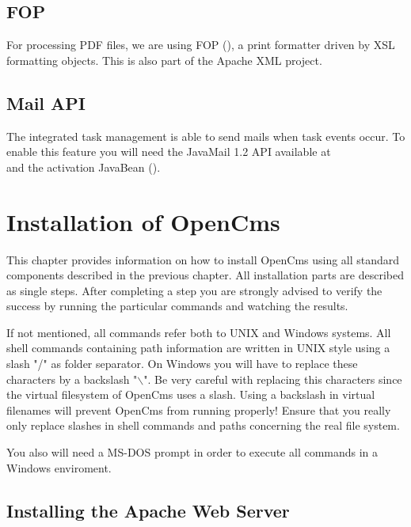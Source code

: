 \section{FOP}
For processing PDF files, we are using FOP 
(),
a print formatter driven by XSL formatting objects. This is also part
of the Apache XML project.

\section{Mail API}
The integrated task management is able to send mails when task events occur.
To enable this feature you will need the JavaMail 1.2 API available at \\ 
 and the activation JavaBean 
().

\chapter{\label{42install}Installation of OpenCms}
This chapter provides information on how to install OpenCms using
all standard components described in the previous chapter. All installation
parts are described as single steps. After completing a step you are strongly
advised to verify the success by running the particular commands and 
watching the results.

If not mentioned, all commands refer both to UNIX and Windows systems.
All shell commands containing path information are written in UNIX style using
a slash "/" as folder separator. On Windows you will have to
replace these characters by a backslash "$\backslash$". 
Be very careful with replacing this characters since the virtual filesystem
of OpenCms uses a slash. Using a backslash in virtual filenames will 
prevent OpenCms from running properly! Ensure that you really only replace
slashes in shell commands and paths concerning the real file system.

You also will need a 
MS-DOS prompt in order to execute all commands in a Windows enviroment.

\section{\label{42apache}Installing the Apache Web Server}

